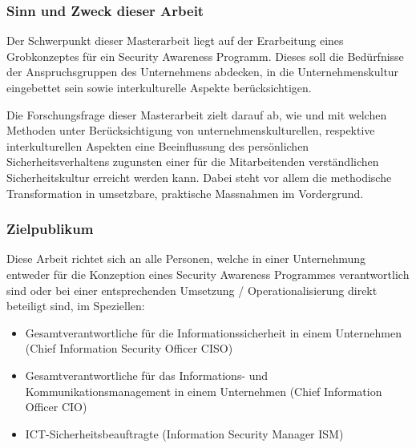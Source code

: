 \documentclass[../../main.tex]{subfiles}
\begin{document}

\subsubsection*{Sinn und Zweck dieser Arbeit}

\begin{sloppypar}
Der Schwerpunkt dieser Masterarbeit liegt auf der Erarbeitung eines Grobkonzeptes für ein Security Awareness Programm. Dieses soll die Bedürfnisse der Anspruchsgruppen des Unternehmens abdecken, in die Unternehmenskultur eingebettet sein sowie interkulturelle Aspekte berücksichtigen.

Die Forschungsfrage dieser Masterarbeit zielt darauf ab, wie und mit welchen Methoden unter Berücksichtigung von unternehmenskulturellen, respektive interkulturellen Aspekten eine Beeinflussung des persönlichen Sicherheitsverhaltens zugunsten einer für die Mitarbeitenden verständlichen Sicherheitskultur erreicht werden kann. Dabei steht vor allem die methodische Transformation in umsetzbare, praktische Massnahmen im Vordergrund.
\end{sloppypar}

\subsubsection*{Zielpublikum}

\begin{sloppypar}
Diese Arbeit richtet sich an alle Personen, welche in einer Unternehmung entweder für die Konzeption eines Security Awareness Programmes verantwortlich sind oder bei einer entsprechenden Umsetzung / Operationalisierung direkt beteiligt sind, im Speziellen:
\begin{itemize}
  \item Gesamtverantwortliche für die Informationssicherheit in einem Unternehmen \newline (Chief Information Security Officer CISO)
  \item Gesamtverantwortliche für das Informations- und Kommunikationsmanagement \newline in einem Unternehmen (Chief Information Officer CIO)
  \item ICT-Sicherheitsbeauftragte (Information Security Manager ISM)
\end{itemize}

\end{sloppypar}
\end{document}
